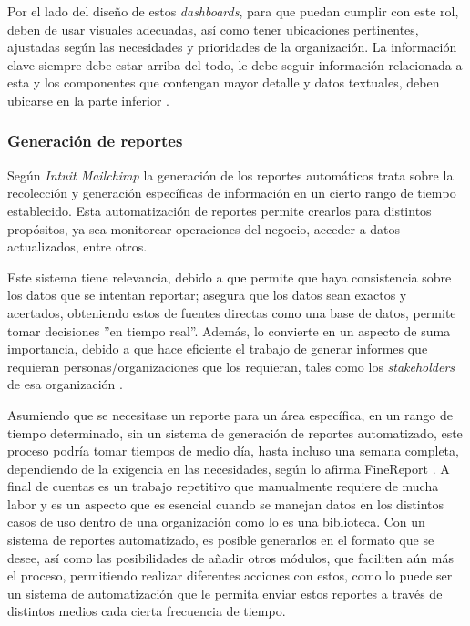 \documentclass[spanish]{ieee_upb}
\begin{document}
\vspace{0.3cm}
Por el lado del diseño de estos \textit{dashboards}, para que puedan cumplir con este rol, deben de usar visuales adecuadas, así como tener ubicaciones pertinentes, ajustadas según las necesidades y prioridades de la organización. La información clave siempre debe estar arriba del todo, le debe seguir información relacionada a esta y los componentes que contengan mayor detalle y datos textuales, deben ubicarse en la parte inferior \cite{zingde2020role}.

\vspace{0.3cm}
\subsubsection{Generación de reportes}
Según \textit{Intuit Mailchimp} \cite{mailchimp_report} la generación de los reportes automáticos trata sobre la recolección y generación específicas de información en un cierto rango de tiempo establecido. Esta automatización de reportes permite crearlos para distintos propósitos, ya sea monitorear operaciones del negocio, acceder a datos actualizados, entre otros.

\vspace{0.3cm}
Este sistema tiene relevancia, debido a que permite que haya consistencia sobre los datos que se intentan reportar; asegura que los datos sean exactos y acertados, obteniendo estos de fuentes directas como una base de datos, permite tomar decisiones ''en tiempo real''. Además, lo convierte en un aspecto de suma importancia, debido a que hace eficiente el trabajo de generar informes que requieran personas/organizaciones que los requieran, tales como los \textit{stakeholders} de esa organización \cite{mailchimp_report}.

\vspace{0.3cm}
Asumiendo que se necesitase un reporte para un área específica, en un rango de tiempo determinado, sin un sistema de generación de reportes automatizado, este proceso podría tomar tiempos de medio día, hasta incluso una semana completa, dependiendo de la exigencia en las necesidades, según lo afirma FineReport \cite{finerep_automatedrep_2024}. A final de cuentas es un trabajo repetitivo que manualmente requiere de mucha labor y es un aspecto que es esencial cuando se manejan datos en los distintos casos de uso dentro de una organización como lo es una biblioteca. Con un sistema de reportes automatizado, es posible generarlos en el formato que se desee, así como las posibilidades de añadir otros módulos, que faciliten aún más el proceso, permitiendo realizar diferentes acciones con estos, como lo puede ser un sistema de automatización que le permita  enviar estos reportes a través de distintos medios cada cierta frecuencia de tiempo.
\end{document}

